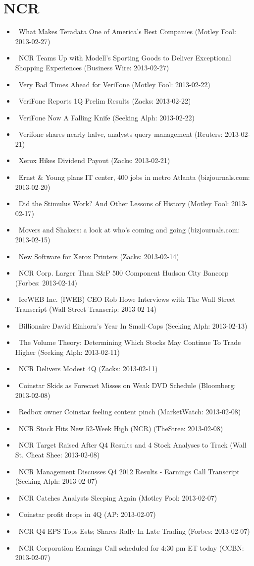 \documentclass[11pt,asymmetric]{article}
\begin{document}
\section*{NCR}
\begin{itemize}
\item\ What Makes Teradata One of America's Best Companies (Motley Fool: 2013-02-27)
\item\ NCR Teams Up with Modell’s Sporting Goods to Deliver Exceptional Shopping Experiences (Business Wire: 2013-02-27)
\item\ Very Bad Times Ahead for VeriFone (Motley Fool: 2013-02-22)
\item\ VeriFone Reports 1Q Prelim Results (Zacks: 2013-02-22)
\item\ VeriFone Now A Falling Knife (Seeking Alph: 2013-02-22)
\item\ Verifone shares nearly halve, analysts query management (Reuters: 2013-02-21)
\item\ Xerox Hikes Dividend Payout (Zacks: 2013-02-21)
\item\ Ernst \& Young plans IT center, 400 jobs in metro Atlanta (bizjournals.com: 2013-02-20)
\item\ Did the Stimulus Work? And Other Lessons of History (Motley Fool: 2013-02-17)
\item\ Movers and Shakers: a look at who’s coming and going (bizjournals.com: 2013-02-15)
\item\ New Software for Xerox Printers (Zacks: 2013-02-14)
\item\ NCR Corp. Larger Than S\&P 500 Component Hudson City Bancorp (Forbes: 2013-02-14)
\item\ IceWEB Inc. (IWEB) CEO Rob Howe Interviews with The Wall Street Transcript (Wall Street Transcrip: 2013-02-14)
\item\ Billionaire David Einhorn's Year In Small-Caps (Seeking Alph: 2013-02-13)
\item\ The Volume Theory: Determining Which Stocks May Continue To Trade Higher (Seeking Alph: 2013-02-11)
\item\ NCR Delivers Modest 4Q (Zacks: 2013-02-11)
\item\ Coinstar Skids as Forecast Misses on Weak DVD Schedule (Bloomberg: 2013-02-08)
\item\ Redbox owner Coinstar feeling content pinch (MarketWatch: 2013-02-08)
\item\ NCR Stock Hits New 52-Week High (NCR) (TheStree: 2013-02-08)
\item\ NCR Target Raised After Q4 Results and 4 Stock Analyses to Track (Wall St. Cheat Shee: 2013-02-08)
\item\ NCR Management Discusses Q4 2012 Results - Earnings Call Transcript (Seeking Alph: 2013-02-07)
\item\ NCR Catches Analysts Sleeping Again (Motley Fool: 2013-02-07)
\item\ Coinstar profit drops in 4Q (AP: 2013-02-07)
\item\ NCR Q4 EPS Tops Ests; Shares Rally In Late Trading (Forbes: 2013-02-07)
\item\ NCR Corporation Earnings Call scheduled for 4:30 pm ET today (CCBN: 2013-02-07)
\end{itemize}
\end{document}
